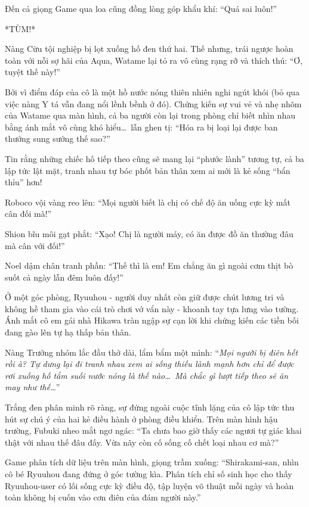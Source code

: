 \documentclass[../main.tex]{subfiles}
\begin{document}

Đến cả giọng Game qua loa cũng đồng lòng góp khẩu khí: ``Quá sai luôn!''

*TÙM!*

Nàng Cừu tội nghiệp bị lọt xuống hố đen thứ hai. Thế nhưng, trái ngược hoàn toàn với nỗi sợ hãi của Aqua, Watame lại tỏ ra vô cùng rạng rỡ và thích thú: ``Ơ, tuyệt thế này!''

Bởi vì điểm đáp của cô là một hồ nước nóng thiên nhiên nghi ngút khói (bỏ qua việc nàng Y tá vẫn đang nổi lềnh bềnh ở đó). Chứng kiến sự vui vẻ và nhẹ nhõm của Watame qua màn hình, cả ba người còn lại trong phòng chỉ biết nhìn nhau bằng ánh mắt vô cùng khó hiểu\dots\ lẫn ghen tị: ``Hóa ra bị loại lại được ban thưởng sung sướng thế sao?''


Tin rằng những chiếc hố tiếp theo cũng sẽ mang lại ``phước lành'' tương tự, cả ba lập tức lật mặt, tranh nhau tự bóc phốt bản thân xem ai mới là kẻ sống ``bẩn thỉu'' hơn!

Roboco vội vàng reo lên: ``Mọi người biết là chị có chế độ ăn uống cực kỳ mất cân đối mà!''

Shion bĩu môi gạt phắt: ``Xạo! Chị là người máy, có ăn được đồ ăn thường đâu mà cân với đối!''

Noel dậm chân tranh phần: ``Thế thì là em! Em chẳng ăn gì ngoài cơm thịt bò suốt cả ngày lẫn đêm luôn đấy!''

Ở một góc phòng, Ryuuhou - người duy nhất còn giữ được chút lương tri và không hề tham gia vào cái trò chơi vớ vẩn này - khoanh tay tựa lưng vào tường. Ánh mắt cô em gái nhà Hikawa tràn ngập sự cạn lời khi chứng kiến các tiền bối đang gào lên tự hạ thấp bản thân.

Nàng Trưởng nhóm lắc đầu thở dài, lẩm bẩm một mình: ``\textit{Mọi người bị điên hết rồi à? Tự dưng lại đi tranh nhau xem ai sống thiếu lành mạnh hơn chỉ để được rơi xuống hố tắm suối nước nóng là thế nào\dots\ Mà chắc gì lượt tiếp theo sẽ ăn may như thế\dots}''

Trắng đen phân minh rõ ràng, sự đứng ngoài cuộc tĩnh lặng của cô lập tức thu hút sự chú ý của hai kẻ điều hành ở phòng điều khiển. Trên màn hình hậu trường, Fubuki nheo mắt ngơ ngác: ``Ta chưa bao giờ thấy các ngươi tự giác khai thật với nhau thế đâu đấy. Vừa nãy còn cố sống cố chết loại nhau cơ mà?''

Game phân tích dữ liệu trên màn hình, giọng trầm xuống: ``Shirakami-san, nhìn cô bé Ryuuhou đang đứng ở góc tường kìa. Phân tích chỉ số sinh học cho thấy Ryuuhou-user có lối sống cực kỳ điều độ, tập luyện võ thuật mỗi ngày và hoàn toàn không bị cuốn vào cơn điên của đám người này.''
\end{document}
